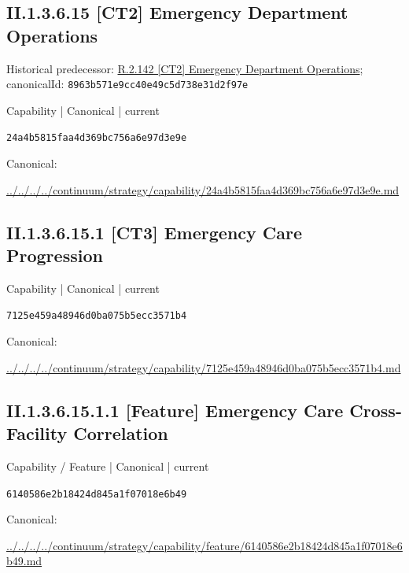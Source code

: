 \documentclass[10pt,a4paper]{article}
\begin{document}
\subsection*{II.1.3.6.15 [CT2] Emergency Department Operations}
Historical predecessor: \hyperref[element-8963b571e9cc40e49c5d738e31d2f97e]{R.2.142 [CT2] Emergency Department Operations}; canonicalId: \texttt{8963b571e9cc40e49c5d738e31d2f97e}\par
\label{element-24a4b5815faa4d369bc756a6e97d3e9e}
{\small Capability | Canonical | current}\par
\texttt{24a4b5815faa4d369bc756a6e97d3e9e}\par
Canonical: \par
{\footnotesize\url{../../../../continuum/strategy/capability/24a4b5815faa4d369bc756a6e97d3e9e.md}}\par
\subsection*{II.1.3.6.15.1 [CT3] Emergency Care Progression}
\label{element-7125e459a48946d0ba075b5ecc3571b4}
{\small Capability | Canonical | current}\par
\texttt{7125e459a48946d0ba075b5ecc3571b4}\par
Canonical: \par
{\footnotesize\url{../../../../continuum/strategy/capability/7125e459a48946d0ba075b5ecc3571b4.md}}\par
\subsection*{II.1.3.6.15.1.1 [Feature] Emergency Care Cross-Facility Correlation}
\label{element-6140586e2b18424d845a1f07018e6b49}
{\small Capability / Feature | Canonical | current}\par
\texttt{6140586e2b18424d845a1f07018e6b49}\par
Canonical: \par
{\footnotesize\url{../../../../continuum/strategy/capability/feature/6140586e2b18424d845a1f07018e6b49.md}}\par
\end{document}
